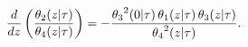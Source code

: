 \[\frac{d}{dz}\left(\frac{\mathop{\theta_{2}\/}\nolimits\!\left(z\middle|\tau%
\right)}{\mathop{\theta_{4}\/}\nolimits\!\left(z\middle|\tau\right)}\right)=-%
\frac{{\mathop{\theta_{3}\/}\nolimits^{2}}\!\left(0\middle|\tau\right)\mathop{%
\theta_{1}\/}\nolimits\!\left(z\middle|\tau\right)\mathop{\theta_{3}\/}%
\nolimits\!\left(z\middle|\tau\right)}{{\mathop{\theta_{4}\/}\nolimits^{2}}\!%
\left(z\middle|\tau\right)}.\]